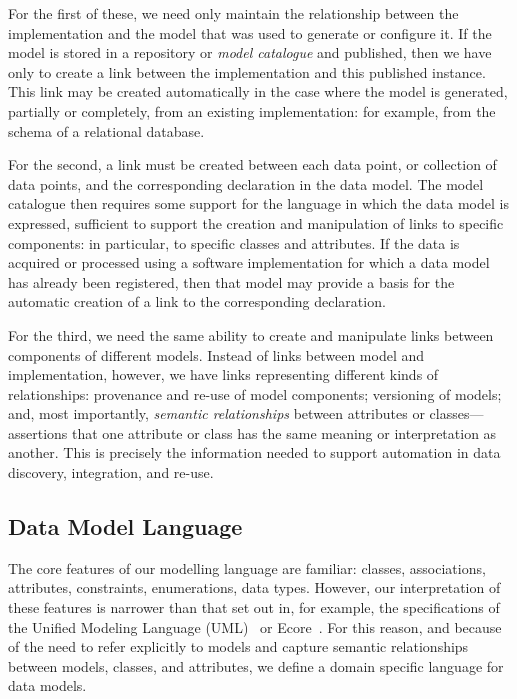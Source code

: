 For the first of these, we need only maintain the relationship between
the implementation and the model that was used to generate or
configure it.  If the model is stored in a repository or \emph{model
  catalogue} and published, then we have only to create a link between
the implementation and this published instance.  This link may be
created automatically in the case where the model is generated,
partially or completely, from an existing implementation: for example,
from the schema of a relational database.

For the second, a link must be created between each data point, or
collection of data points, and the corresponding declaration in the
data model.  The model catalogue then requires some support for the
language in which the data model is expressed, sufficient to support
the creation and manipulation of links to specific components: in
particular, to specific classes and attributes.  If the data is
acquired or processed using a software implementation for which a data
model has already been registered, then that model may provide a basis
for the automatic creation of a link to the corresponding declaration.

For the third, we need the same ability to create and manipulate links
between components of different models.  Instead of links between
model and implementation, however, we have links representing
different kinds of relationships: provenance and re-use of model
components; versioning of models; and, most importantly,
\emph{semantic relationships} between attributes or
classes---assertions that one attribute or class has the same meaning
or interpretation as another.  This is precisely the information
needed to support automation in data discovery, integration, and
re-use.

\subsection{Data Model Language}

The core features of our modelling language are familiar: classes,
associations, attributes, constraints, enumerations, data types.
However, our interpretation of these features is narrower than that
set out in, for example, the specifications of the Unified Modeling
Language (UML)~\cite{UML} or Ecore~\cite{ECORE}.  For this reason, and
because of the need to refer explicitly to models and capture semantic
relationships between models, classes, and attributes, we define a
domain specific language for data models.

